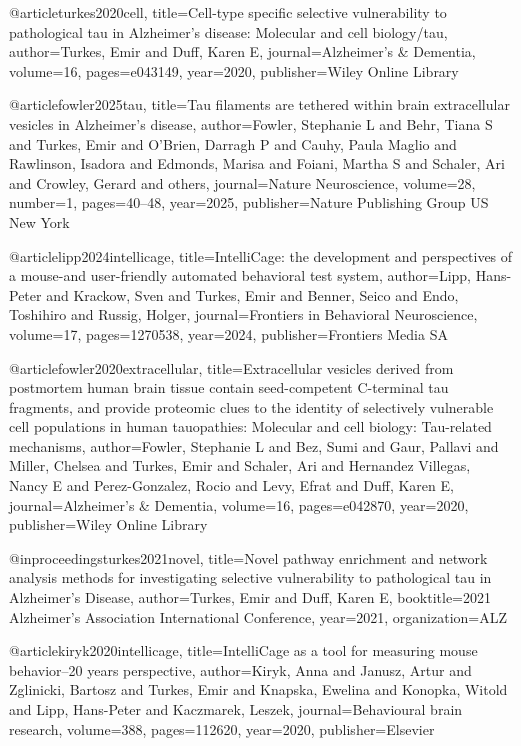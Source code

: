 @article{turkes2020cell,
  title={Cell-type specific selective vulnerability to pathological tau in Alzheimer's disease: Molecular and cell biology/tau},
  author={Turkes, Emir and Duff, Karen E},
  journal={Alzheimer's \& Dementia},
  volume={16},
  pages={e043149},
  year={2020},
  publisher={Wiley Online Library}
}

@article{fowler2025tau,
  title={Tau filaments are tethered within brain extracellular vesicles in Alzheimer’s disease},
  author={Fowler, Stephanie L and Behr, Tiana S and Turkes, Emir and O’Brien, Darragh P and Cauhy, Paula Maglio and Rawlinson, Isadora and Edmonds, Marisa and Foiani, Martha S and Schaler, Ari and Crowley, Gerard and others},
  journal={Nature Neuroscience},
  volume={28},
  number={1},
  pages={40--48},
  year={2025},
  publisher={Nature Publishing Group US New York}
}

@article{lipp2024intellicage,
  title={IntelliCage: the development and perspectives of a mouse-and user-friendly automated behavioral test system},
  author={Lipp, Hans-Peter and Krackow, Sven and Turkes, Emir and Benner, Seico and Endo, Toshihiro and Russig, Holger},
  journal={Frontiers in Behavioral Neuroscience},
  volume={17},
  pages={1270538},
  year={2024},
  publisher={Frontiers Media SA}
}

@article{fowler2020extracellular,
  title={Extracellular vesicles derived from postmortem human brain tissue contain seed-competent C-terminal tau fragments, and provide proteomic clues to the identity of selectively vulnerable cell populations in human tauopathies: Molecular and cell biology: Tau-related mechanisms},
  author={Fowler, Stephanie L and Bez, Sumi and Gaur, Pallavi and Miller, Chelsea and Turkes, Emir and Schaler, Ari and Hernandez Villegas, Nancy E and Perez-Gonzalez, Rocio and Levy, Efrat and Duff, Karen E},
  journal={Alzheimer's \& Dementia},
  volume={16},
  pages={e042870},
  year={2020},
  publisher={Wiley Online Library}
}

@inproceedings{turkes2021novel,
  title={Novel pathway enrichment and network analysis methods for investigating selective vulnerability to pathological tau in Alzheimer’s Disease},
  author={Turkes, Emir and Duff, Karen E},
  booktitle={2021 Alzheimer's Association International Conference},
  year={2021},
  organization={ALZ}
}

@article{kiryk2020intellicage,
  title={IntelliCage as a tool for measuring mouse behavior--20 years perspective},
  author={Kiryk, Anna and Janusz, Artur and Zglinicki, Bartosz and Turkes, Emir and Knapska, Ewelina and Konopka, Witold and Lipp, Hans-Peter and Kaczmarek, Leszek},
  journal={Behavioural brain research},
  volume={388},
  pages={112620},
  year={2020},
  publisher={Elsevier}
}

